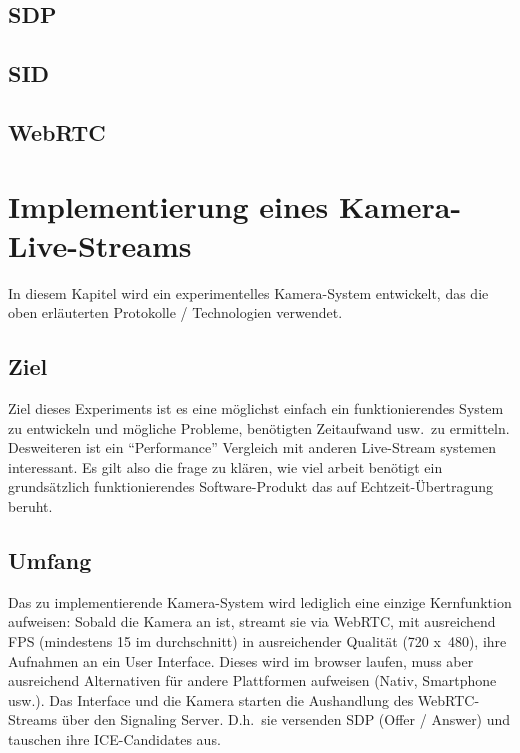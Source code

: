 \documentclass[journal]{IEEEtran}
\begin{document}
\begin{twocolumn}
\subsection{SDP}
\subsection{SID}
\subsection{WebRTC}

\section{Implementierung eines Kamera-Live-Streams}

In diesem Kapitel wird ein experimentelles Kamera-System entwickelt, das die
oben erläuterten Protokolle / Technologien verwendet.

\subsection{Ziel}
Ziel dieses Experiments ist es eine möglichst einfach ein funktionierendes
System zu entwickeln und mögliche Probleme, benötigten Zeitaufwand usw.\ zu
ermitteln.  Desweiteren ist ein ``Performance'' Vergleich mit anderen
Live-Stream systemen interessant. Es gilt also die frage zu klären, wie viel
arbeit benötigt ein grundsätzlich funktionierendes Software-Produkt das auf
Echtzeit-Übertragung beruht.

\subsection{Umfang}

Das zu implementierende Kamera-System wird lediglich eine einzige Kernfunktion
aufweisen: Sobald die Kamera an ist, streamt sie via WebRTC, mit ausreichend
FPS (mindestens 15 im durchschnitt) in ausreichender Qualität (720 x\ 480),
ihre Aufnahmen an ein User Interface. Dieses wird im browser laufen, muss aber
ausreichend Alternativen für andere Plattformen aufweisen (Nativ, Smartphone
usw.). Das Interface und die Kamera starten die Aushandlung des
WebRTC-Streams über den Signaling Server. D.h.\ sie versenden SDP (Offer /
Answer) und tauschen ihre ICE-Candidates aus.


\end{twocolumn}
\end{document}
